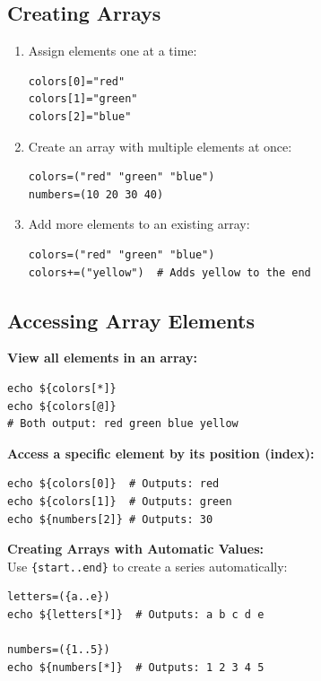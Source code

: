 \subsection{Creating Arrays}
\begin{enumerate}
    \item Assign elements one at a time:
\begin{lstlisting}[language=Terminal]
colors[0]="red"
colors[1]="green"
colors[2]="blue"
\end{lstlisting}

    \item Create an array with multiple elements at once:
\begin{lstlisting}[language=Terminal]
colors=("red" "green" "blue")
numbers=(10 20 30 40)
\end{lstlisting}

    \item Add more elements to an existing array:
\begin{lstlisting}[language=Terminal]
colors=("red" "green" "blue")
colors+=("yellow")  # Adds yellow to the end
\end{lstlisting}
\end{enumerate}

\subsection{Accessing Array Elements}

\textbf{View all elements in an array:}
\begin{lstlisting}[language=Terminal]
echo ${colors[*]}
echo ${colors[@]}
# Both output: red green blue yellow
\end{lstlisting}

\textbf{Access a specific element by its position (index):}
\begin{lstlisting}[language=Terminal]
echo ${colors[0]}  # Outputs: red
echo ${colors[1]}  # Outputs: green
echo ${numbers[2]} # Outputs: 30
\end{lstlisting}

\textbf{Creating Arrays with Automatic Values:}\\
Use \texttt{\{start..end\}} to create a series automatically:
\begin{lstlisting}[language=Terminal]
letters=({a..e})
echo ${letters[*]}  # Outputs: a b c d e

numbers=({1..5})
echo ${numbers[*]}  # Outputs: 1 2 3 4 5
\end{lstlisting}


